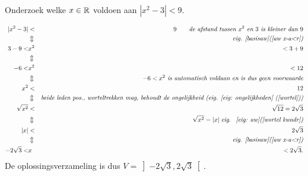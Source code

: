 \documentclass{ximera}
\begin{document}
\begin{problem}	Onderzoek welke $x\in \mathbb{R}$ voldoen aan $|x^2-3|<9$.
		\begin{expandable}
		\begin{oplossing}
			\begin{eqnarray*}|x^2-3|&<&9 \qquad \textit{de afstand tussen $x^2$ en $3$ is
					kleiner dan $9$}\\&\Updownarrow &\textit{eig.
					\ref{basisaw}(\ref{aw x-a<r})}
				\\3-9<&x^2&<3+9\\&\Updownarrow
				&\\-6<&x^2&<12\\&\Updownarrow&\textit{$-6<x^2$ is automatisch
					voldaan en is dus geen
					voorwaarde}\\x^2&<&12\\&\Updownarrow&\textit{beide leden pos.,
					worteltrekken mag, behoudt de ongelijkheid (eig. \ref{eig:
						ongelijkheden}
					(\ref{wortel}))}\\\sqrt{x^2}&<&\sqrt{12}=2\sqrt{3}\\&\Updownarrow
				&\qquad \sqrt{x^2}=|x| \;\textit{eig. ~\ref{eig: aw}(\ref{wortel
						kwadr})}\\|x|&<&2\sqrt{3}
				\\&\Updownarrow &\textit{eig. \ref{basisaw}(\ref{aw x-a<r})}\\-2\sqrt{3}<&x&<2\sqrt{3}.
			\end{eqnarray*}
			De oplossingsverzameling is dus $\displaystyle
			V=\left]-2\sqrt{3},2\sqrt{3}\right[.$
		\end{oplossing}
		\end{expandable}

\end{problem}
\end{document}
